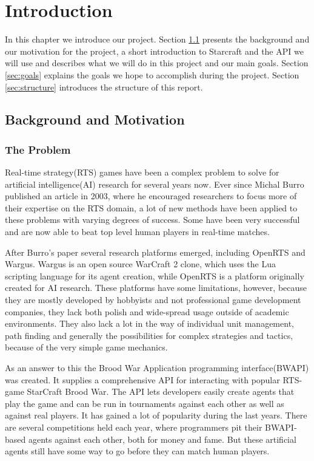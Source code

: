 
\chapter{Introduction}
In this chapter we introduce our project. Section \ref{sec:background} presents the background and our motivation for the project, a short introduction to Starcraft and the API we will use and describes what we will do in this project and our main goals. Section \ref{sec:goals} explains the goals we hope to accomplish during the project. Section \ref{sec:structure} introduces the structure of this report.

\section{Background and Motivation}
\label{sec:background}

\subsection{The Problem}
Real-time strategy(RTS) games have been a complex problem to solve for artificial intelligence(AI) research for several years now. Ever since Michal Burro published an article in 2003\cite{buro2003real}, where he encouraged researchers to focus more of their expertise on the RTS domain, a lot of new methods have been applied to these problems with varying degrees of success. Some have been very successful and are now able to beat top level human players in real-time matches.\cite{campbell2002deep} 

After Burro's paper several research platforms emerged, including OpenRTS\cite{buro2003orts} and Wargus\cite{wargus}. Wargus is an open source WarCraft 2 clone, which uses the Lua scripting language for its agent creation, while OpenRTS is a platform originally created for AI research. These platforms have some limitations, however, because they are mostly developed by hobbyists and not professional game development companies, they lack both polish and wide-spread usage outside of academic environments. They also lack a lot in the way of individual unit management, path finding and generally the possibilities for complex strategies and tactics, because of the very simple game mechanics. 

As an answer to this the Brood War Application programming interface(BWAPI) was created. It supplies a comprehensive API for interacting with popular RTS-game StarCraft Brood War. The API lets developers easily create agents that play the game and can be run in tournaments against each other as well as against real players. It has gained a lot of popularity during the last years.\cite{bwapi} There are several competitions held each year, where programmers pit their BWAPI-based agents against each other, both for money and fame.\cite{sscait} But these artificial agents still have some way to go before they can match human players.\cite{eisbotvsfong}

